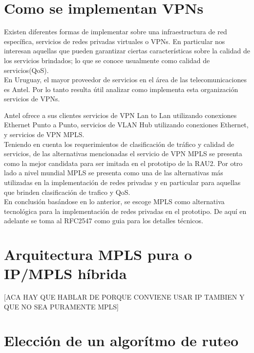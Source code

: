\section[Como se implementan VPNs)]{Como se implementan VPNs}

Existen diferentes formas de implementar sobre una infraestructura de red espec\'ifica, servicios de redes privadas virtuales o VPNs. En particular nos interesan aquellas que pueden garantizar ciertas caracter\'isticas sobre la calidad de los servicios brindados; lo que se conoce usualmente como calidad de servicios(QoS).\\

En Uruguay, el mayor proveedor de servicios en el área de las telecomunicaciones es Antel. Por lo tanto resulta útil analizar como implementa esta organización servicios de VPNs. 

Antel ofrece a sus clientes\citep{Antel} servicios de VPN Lan to Lan utilizando conexiones Ethernet Punto a Punto, servicios de VLAN Hub utilizando conexiones Ethernet, y servicios de VPN MPLS.\\

Teniendo en cuenta los requerimientos de clasificación de tr\'afico y calidad de servicios, de las alternativas mencionadas el servicio de VPN MPLS se presenta como la mejor candidata para ser imitada en el prototipo de la RAU2. Por otro lado a nivel mundial MPLS se presenta como una de las alternativas m\'as utilizadas en la implementaci\'on de redes privadas y en particular para aquellas que brinden clasificación de trafico y QoS.\\ 

En conclusión basándose en lo anterior, se escoge MPLS como alternativa tecnológica para la implementaci\'on de redes privadas en el prototipo. De aquí en adelante se toma al RFC2547\citep{rosen1999bgp} como guia para los detalles técnicos. 

\section[Arquitectura MPLS pura o IP/MPLS h\'ibrida]{Arquitectura MPLS pura o IP/MPLS h\'ibrida}

[ACA HAY QUE HABLAR DE PORQUE CONVIENE USAR IP TAMBIEN Y QUE NO SEA PURAMENTE MPLS]
\section[Elecci\'on de un algor\'itmo de ruteo]{Elecci\'on de un algor\'itmo de ruteo}

